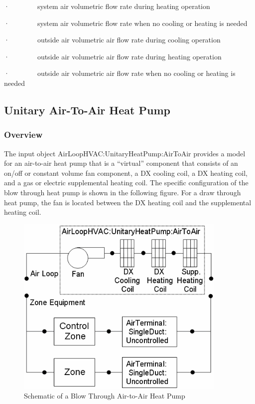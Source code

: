 ·~~~~~~~~system air volumetric flow rate during heating operation

·~~~~~~~~system air volumetric flow rate when no cooling or heating is needed

·~~~~~~~~outside air volumetric air flow rate during cooling operation

·~~~~~~~~outside air volumetric air flow rate during heating operation

·~~~~~~~~outside air volumetric air flow rate when no cooling or heating is needed

\subsection{Unitary Air-To-Air Heat Pump}\label{unitary-air-to-air-heat-pump}

\subsubsection{Overview}\label{overview-3}

The input object AirLoopHVAC:UnitaryHeatPump:AirToAir provides a model for an air-to-air heat pump that is a ``virtual'' component that consists of an on/off or constant volume fan component, a DX cooling coil, a DX heating coil, and a gas or electric supplemental heating coil. The specific configuration of the blow through heat pump is shown in the following figure. For a draw through heat pump, the fan is located between the DX heating coil and the supplemental heating coil.

\begin{figure}[hbtp] %
\centering
\includegraphics[width=0.9\textwidth, height=0.9\textheight, keepaspectratio=true]{media/image5106.png}
\caption{Schematic of a Blow Through Air-to-Air Heat Pump \protect \label{fig:schematic-of-a-blow-through-air-to-air-heat}}
\end{figure}

